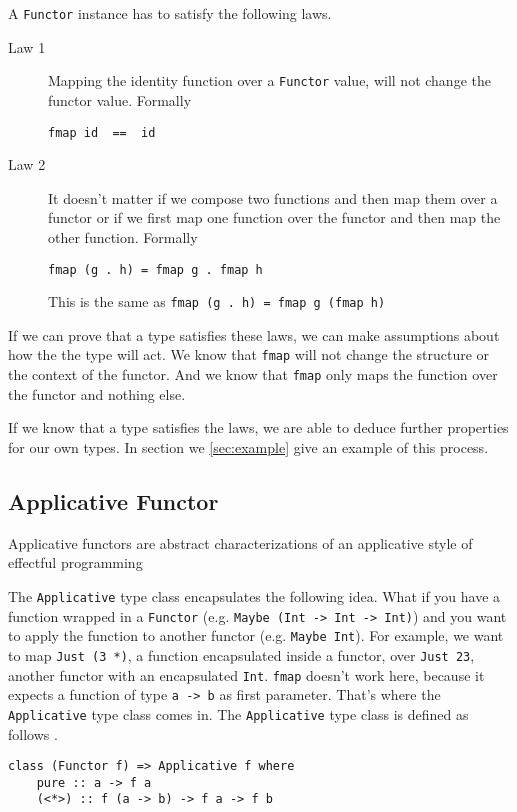 A \verb|Functor| instance has to satisfy the following laws.

\begin{description}
\item[Law 1] Mapping the identity function over a \verb|Functor| value, will not change the functor value. Formally
\begin{verbatim}
fmap id  ==  id
\end{verbatim}
\item[Law 2] It doesn't matter if we compose two functions and then map them over a functor or if we first map one function over the functor and then map the other function. Formally
\begin{verbatim}
fmap (g . h) = fmap g . fmap h
\end{verbatim}
This is the same as \verb|fmap (g . h) = fmap g (fmap h)|
\end{description}

If we can prove that a type satisfies these laws, we can make assumptions about how the the type will act. We know that \verb|fmap| will not change the structure or the context of the functor.
And we know that \verb|fmap| only maps the function over the functor and nothing else. 

If we know that a type satisfies the laws, we are able to deduce further properties for our own types. In section we \ref{sec:example} give an example of this process.

\subsection{Applicative Functor}
\label{sec:applicatives}

Applicative functors are abstract characterizations of an applicative style of effectful programming \cite{mcbride} \cite{control.applicative}

The \verb|Applicative| type class encapsulates the following idea. What if you have a function wrapped in a \verb|Functor| (e.g. \verb|Maybe (Int -> Int -> Int)|) and you want to apply the function to another functor (e.g. \verb|Maybe Int|). For example, we want to map \verb|Just (3 *)|, a function encapsulated inside a functor, over \verb|Just 23|, another functor with an encapsulated \verb|Int|. \verb|fmap| doesn't work here, because it expects a function of type \verb|a -> b| as first parameter. That's where the \verb|Applicative| type class comes in. 
The \verb|Applicative| type class is defined as follows \cite{control.applicative}.
\begin{verbatim}
class (Functor f) => Applicative f where
    pure :: a -> f a
    (<*>) :: f (a -> b) -> f a -> f b
\end{verbatim}

